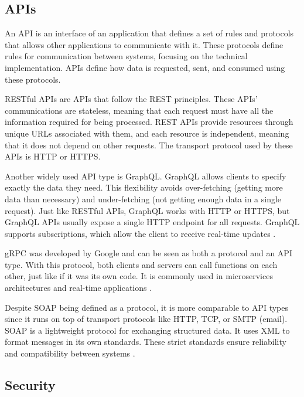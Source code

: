\subsection{APIs}
An \gls{API} is an interface of an application that defines a set of rules and
protocols that allows other applications to communicate with it.
These protocols define rules for communication between systems, focusing on the
technical implementation. \gls{API}s define how data is requested, sent, and
consumed using these protocols.

\gls{REST}ful \gls{API}s are \gls{API}s that follow the \gls{REST} principles.
These \gls{API}s' communications are stateless, meaning that each request must
have all the information required for being processed.
\gls{REST} \gls{API}s provide resources through unique \gls{URL}s associated with them, and
each resource is independent, meaning that it does not depend on other
requests. The transport protocol used by these \gls{API}s is \gls{HTTP} or \gls{HTTPS}\cite {9101226}.

Another widely used API type is GraphQL.
GraphQL allows clients to specify exactly the data they need. This
flexibility avoids over-fetching (getting more data than necessary) and
under-fetching (not getting enough data in a single request).
Just like \gls{REST}ful \gls{API}s, GraphQL works with \gls{HTTP} or \gls{HTTPS},
but GraphQL \gls{API}s usually expose a single \gls{HTTP} endpoint for all
requests. GraphQL supports subscriptions, which allow the client to receive
real-time updates \cite{9101226}.

\gls{gRPC} was developed by Google and can be seen as both a protocol and an
\gls{API} type. With this protocol, both clients and servers can call
functions on each other, just like if it was its own code.
It is commonly used in microservices architectures and real-time applications \cite{newton2024benchmarking}.

Despite \gls{SOAP} being defined as a protocol, it is more comparable to \gls{API}
types since it runs on top of transport protocols like \gls{HTTP}, \gls{TCP}, or
\gls{SMTP} (email).
\gls{SOAP} is a lightweight protocol for exchanging structured data. It uses \gls{XML}
to format messages in its own standards. These strict standards ensure
reliability and compatibility between systems \cite{newton2024benchmarking}.

\subsection{Security}

